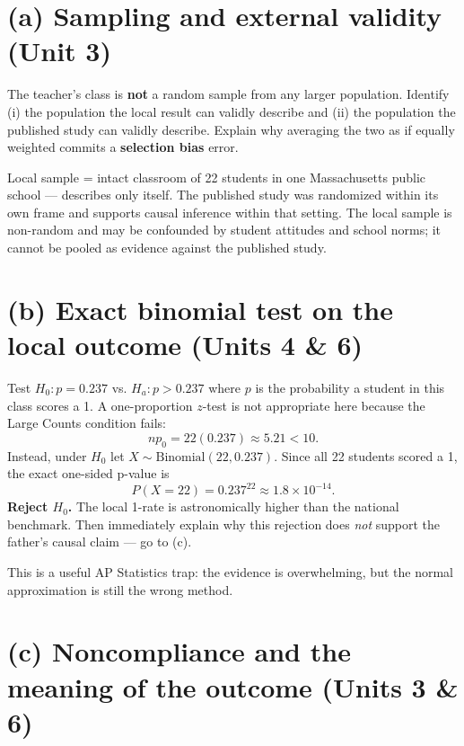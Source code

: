 \documentclass[11pt]{article}
\begin{document}
\section{(a) Sampling and external validity \textnormal{\small(Unit 3)}}

The teacher's class is \textbf{not} a random sample from any larger
population. Identify (i) the population the local result can validly
describe and (ii) the population the published study can validly
describe. Explain why averaging the two as if equally weighted commits
a \textbf{selection bias} error.

\begin{expectedbox}
Local sample = intact classroom of 22 students in one Massachusetts
public school --- describes only itself. The published study was
randomized within its own frame and supports causal inference within
that setting. The local sample is non-random and may be confounded by
student attitudes and school norms; it cannot be pooled as evidence
against the published study.
\end{expectedbox}

\section{(b) Exact binomial test on the local outcome \textnormal{\small(Units 4 \& 6)}}

Test $H_0: p = 0.237$ vs. $H_a: p > 0.237$ where $p$ is the probability
a student in this class scores a 1. A one-proportion $z$-test is not
appropriate here because the Large Counts condition fails:
\[
np_0 = 22(0.237) \approx 5.21 < 10.
\]
Instead, under $H_0$ let $X \sim \text{Binomial}(22, 0.237)$. Since all
22 students scored a 1, the exact one-sided p-value is
\[
P(X = 22) = 0.237^{22} \approx 1.8 \times 10^{-14}.
\]
\textbf{Reject $H_0$.} The local 1-rate is astronomically higher than
the national benchmark. Then immediately explain why this rejection
does \emph{not} support the father's causal claim --- go to (c).

\begin{notebox}
This is a useful AP Statistics trap: the evidence is overwhelming,
but the normal approximation is still the wrong method.
\end{notebox}

\section{(c) Noncompliance and the meaning of the outcome \textnormal{\small(Units 3 \& 6)}}
\end{document}
